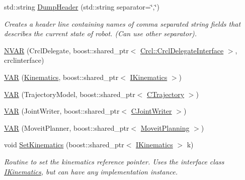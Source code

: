\begin{DoxyCompactItemize}
std\-::string \hyperlink{structRCS_1_1CController_aaf2b0286ce10f78e5eee44e3613e588e}{Dump\-Header} (std\-::string separator=\char`\"{},\char`\"{})
\begin{DoxyCompactList}\small\item\em Creates a header line containing names of comma separated string fields that describes the current state of robot. (Can use other separator). \end{DoxyCompactList}\item 
\hyperlink{structRCS_1_1CController_a217e4bc45f9cc45a8b4e927e3e76d9c6}{N\-V\-A\-R} (Crcl\-Delegate, boost\-::shared\-\_\-ptr$<$ \hyperlink{classCrcl_1_1CrclDelegateInterface}{Crcl\-::\-Crcl\-Delegate\-Interface} $>$, crclinterface)
\item 
\hyperlink{structRCS_1_1CController_abb822466798247a45d3206ecae9c36fc}{V\-A\-R} (\hyperlink{SanityCheckTests_8cpp_ac2d60ae645ce73be6021c92b37789e7c}{Kinematics}, boost\-::shared\-\_\-ptr$<$ \hyperlink{classIKinematics}{I\-Kinematics} $>$)
\item 
\hyperlink{structRCS_1_1CController_a220e4784a98f240d3421ae67c79356d2}{V\-A\-R} (Trajectory\-Model, boost\-::shared\-\_\-ptr$<$ \hyperlink{classCTrajectory}{C\-Trajectory} $>$)
\item 
\hyperlink{structRCS_1_1CController_abe34674042d0b1b983a3e4117310f66c}{V\-A\-R} (Joint\-Writer, boost\-::shared\-\_\-ptr$<$ \hyperlink{classCJointWriter}{C\-Joint\-Writer} $>$)
\item 
\hyperlink{structRCS_1_1CController_a4bada8d96b15d19a1b4255f00993a241}{V\-A\-R} (Moveit\-Planner, boost\-::shared\-\_\-ptr$<$ \hyperlink{classMoveitPlanning}{Moveit\-Planning} $>$)
\item 
void \hyperlink{structRCS_1_1CController_a2733d3cf36b11a6b257e04a969e03abf}{Set\-Kinematics} (boost\-::shared\-\_\-ptr$<$ \hyperlink{classIKinematics}{I\-Kinematics} $>$ k)
\begin{DoxyCompactList}\small\item\em Routine to set the kinematics reference pointer. Uses the interface class \hyperlink{classIKinematics}{I\-Kinematics}, but can have any implementation instance. \end{DoxyCompactList}\end{DoxyCompactItemize}
